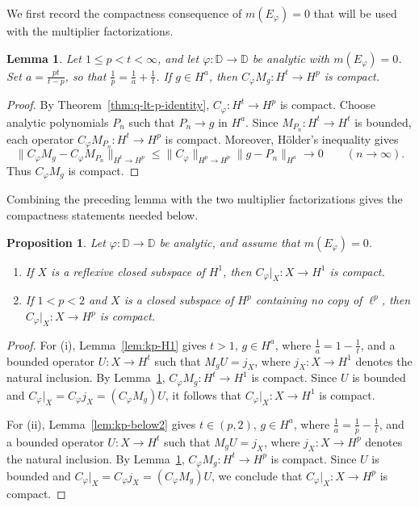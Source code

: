\documentclass[10pt,a4paper]{amsart}
\newtheorem{lemma}[theorem]{Lemma}
\newtheorem{proposition}[theorem]{Proposition}
\newcommand{\D}{\mathbb{D}}
\begin{document}
We first record the compactness consequence of
\(m(E_\varphi)=0\) that will be used with the multiplier
factorizations.

\begin{lemma}
\label{lem:diag-compact}
Let \(1\le p<t<\infty\), and let \(\varphi:\D\to\D\) be analytic
with \(m(E_\varphi)=0\). Set \(a=\frac{pt}{t-p}\), so that
\(\frac1 p=\frac1 a+\frac1 t\). If \(g\in H^a\), then
\(C_\varphi M_g:H^t\to H^p\) is compact.
\end{lemma}

\begin{proof}
By Theorem~\ref{thm:q-lt-p-identity},
\(C_\varphi:H^t\to H^p\) is compact. Choose analytic polynomials
\(P_n\) such that \(P_n\to g\) in \(H^a\). Since
\(M_{P_n}:H^t\to H^t\) is bounded, each operator
\(C_\varphi M_{P_n}:H^t\to H^p\) is compact. Moreover, H\"older's
inequality gives
\[
        \|C_\varphi M_g-C_\varphi M_{P_n}\|_{H^t\to H^p}
        \le
        \|C_\varphi\|_{H^p\to H^p}
        \|g-P_n\|_{H^a}
       \longrightarrow 0 \qquad (n\to\infty).
\]
Thus \(C_\varphi M_g\) is compact.
\end{proof}
Combining the preceding lemma with the two multiplier factorizations
gives the compactness statements needed below.

\begin{proposition}
\label{prop:diag-compact}
Let \(\varphi:\D\to\D\) be analytic, and assume that
\(m(E_\varphi)=0\).
\begin{enumerate}[label=\textup{(\roman*)}]
\item If \(X\) is a reflexive closed subspace of \(H^1\), then
\(C_\varphi|_X:X\to H^1\) is compact.
\item If \(1<p<2\) and \(X\) is a closed subspace of \(H^p\)
containing no copy of \(\ell^p\), then
\(C_\varphi|_X:X\to H^p\) is compact.
\end{enumerate}
\end{proposition}

\begin{proof}
For \textup{(i)},
Lemma~\ref{lem:kp-H1} gives \(t>1\),
\(g\in H^a\), where \(\frac1 a=1-\frac1 t\), and a bounded operator
\(U:X\to H^t\) such that \(M_gU=j_X\), where
\(j_X:X\to H^1\) denotes the natural inclusion. By
Lemma~\ref{lem:diag-compact},
\(C_\varphi M_g:H^t\to H^1\) is compact. Since \(U\) is bounded and
\(C_\varphi|_X=C_\varphi j_X=(C_\varphi M_g)U\),
it follows that \(C_\varphi|_X:X\to H^1\) is compact.

For \textup{(ii)},
Lemma~\ref{lem:kp-below2} gives \(t\in(p,2)\),
\(g\in H^a\), where \(\frac1 a=\frac1 p-\frac1 t\), and a bounded operator
\(U:X\to H^t\) such that \(M_gU=j_X\), where
\(j_X:X\to H^p\) denotes the natural inclusion. By
Lemma~\ref{lem:diag-compact},
\(C_\varphi M_g:H^t\to H^p\) is compact. Since \(U\) is bounded and
\(C_\varphi|_X=C_\varphi j_X=(C_\varphi M_g)U\),
we conclude that \(C_\varphi|_X:X\to H^p\) is compact.
\end{proof}
\end{document}
